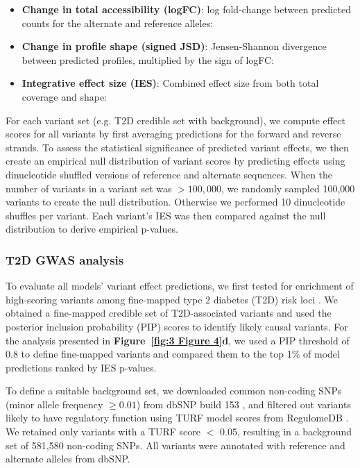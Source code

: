 \begin{itemize}
    \item \textbf{Change in total accessibility (logFC)}: log fold-change between predicted counts for the alternate and reference alleles:
    \item \textbf{Change in profile shape (signed JSD)}: Jensen-Shannon divergence between predicted profiles, multiplied by the sign of logFC:
    \item \textbf{Integrative effect size (IES)}: Combined effect size from both total coverage and shape:\
\end{itemize}

For each variant set (e.g. T2D credible set with background), we compute effect scores for all variants by first averaging predictions for the forward and reverse strands. To assess the statistical significance of predicted variant effects, we then create an empirical null distribution of variant scores by predicting effects using dinucleotide shuffled versions of reference and alternate sequences. When the number of variants in a variant set was \(> 100{,}000\), we randomly sampled 100{,}000 variants to create the null distribution. Otherwise we performed 10 dinucleotide shuffles per variant. Each variant’s IES was then compared against the null distribution to derive empirical p-values.

\subsubsection{T2D GWAS analysis}

To evaluate all models’ variant effect predictions, we first tested for enrichment of high-scoring variants among fine-mapped type 2 diabetes (T2D) risk loci \cite{Mahajan2022-hu}. We obtained a fine-mapped credible set of T2D-associated variants and used the posterior inclusion probability (PIP) scores to identify likely causal variants. For the analysis presented in \textbf{Figure~\ref{fig:3 Figure 4}d}, we used a PIP threshold of 0.8 to define fine-mapped variants and compared them to the top 1\% of model predictions ranked by IES p-values.

To define a suitable background set, we downloaded common non-coding SNPs (minor allele frequency \(\geq 0.01\)) from dbSNP build 153 \cite{Sherry2001-pk}, and filtered out variants likely to have regulatory function using TURF model scores from RegulomeDB \cite{Dong2023-fh}. We retained only variants with a TURF score $<$ 0.05, resulting in a background set of 581,580 non-coding SNPs. All variants were annotated with reference and alternate alleles from dbSNP.

